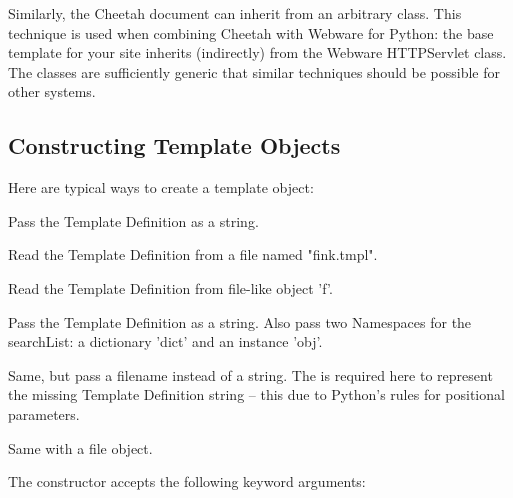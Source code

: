 Similarly, the Cheetah document can inherit from an arbitrary class. This
technique is used when combining Cheetah with Webware for Python: the base
template for your site inherits (indirectly) from the Webware HTTPServlet class.
The classes are sufficiently generic that similar techniques should be possible
for other systems.

\subsection{Constructing Template Objects}
\label{howWorks.constructing}


Here are typical ways to create a template object:
\begin{description}
\item{}
     Pass the Template Definition as a string.
\item{}
     Read the Template Definition from a file named "fink.tmpl".  
\item{}
     Read the Template Definition from file-like object 'f'.
\item{}
     Pass the Template Definition as a string.  Also pass two Namespaces for the
     searchList: a dictionary 'dict' and an instance 'obj'.
\item{}
     Same, but pass a filename instead of a string.  The  is required
     here to represent the missing Template Definition string -- this due to
     Python's rules for positional parameters.
\item{}
     Same with a file object.
\end{description}

The constructor accepts the following keyword arguments:

